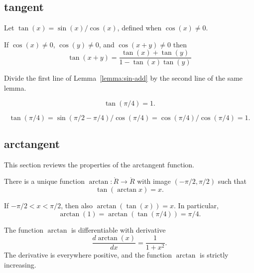 \subsection{tangent}
\label{sec:tangent}

\begin{definition}[tangent]\label{def:tan}
Let $\tan(x) = \sin(x)/\cos(x)$, defined when $\cos(x)\ne0$.
\end{definition}


\begin{lemma}\label{lemma:tan-add}
    If $\cos(x)\ne 0$, $\cos(y)\ne 0$, and $\cos(x+y)\ne0$ then
    $$\tan(x+y) = \frac{\tan(x) + \tan(y) }{ 1 - \tan(x)\tan(y)}$$
\end{lemma}

\begin{proved}
  Divide the first line of Lemma~\ref{lemma:sin-add} by the second
  line of the same lemma.
\swallowed\end{proved}

\begin{lemma}\label{lemma:tan-pi4}
    $$\tan(\pi/4) = 1.$$
\end{lemma}

\begin{proved}
    $$\tan(\pi/4) = \sin(\pi/2-\pi/4)/\cos(\pi/4) =
    \cos(\pi/4)/\cos(\pi/4) = 1.$$
\swallowed\end{proved}


\subsection{arctangent}

This section reviews the properties of the arctangent function.

\begin{definition}[arctangent]\label{def:arctan}
There is a unique function $\arctan:\ring{R}\to\ring{R}$ with
image $(-\pi/2,\pi/2)$ such that
    $$\tan(\arctan x) =x.$$
\end{definition}

If $-\pi/2 < x < \pi/2$, then also $\arctan(\tan(x)) = x$. In
particular,
    $$\arctan(1) = \arctan(\tan(\pi/4)) = \pi/4.$$


The function $\arctan$ is differentiable with derivative%
    $$\frac{d \arctan(x)}{dx} = \frac{1}{1 + x^2}.$$
The derivative is everywhere positive, and the function $\arctan$ is
strictly increasing.


